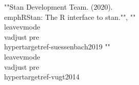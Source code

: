 {{{{{{{{{{{{{{{{{{{{{{{{{{{{""Stan Development Team. (2020). \\emph{{RStan}: The {R} interface to stan}."", ""\\leavevmode\\vadjust pre{\\hypertarget{ref-suessenbach2019}{}}%
""\\leavevmode\\vadjust pre{\\hypertarget{ref-vugt2014}{}}%
}}}}}}}}}}}}}}}}}}}}}}}}}}}}
